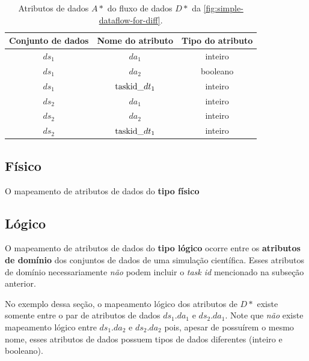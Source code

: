 \begin{table}[htb]
    \centering
    \begin{tabular}{c|c|c}
    \textbf{Conjunto de dados} & \textbf{Nome do atributo} & \textbf{Tipo do atributo} \\ \hline
$ds_1$                        & $da_1$                        & inteiro                 \\
$ds_1$                        & $da_2$                        & booleano                \\
$ds_1$                        & $\textup{taskid\_}dt_1$      & inteiro                 \\ \hline
$ds_2$                        & $da_1$                        & inteiro                 \\
$ds_2$                        & $da_2$                        & inteiro                 \\
$ds_2$                        & $\textup{taskid\_}dt_1$      & inteiro                
    \end{tabular}
    \caption[Atributos de dados do fluxo de dados da \autoref{fig:simple-dataflow-for-diff}]{Atributos de dados \(A\ast\) do fluxo de dados \(D\ast\) da \autoref{fig:simple-dataflow-for-diff}.}
    \label{tab:simple-attributes-for-diff}
\end{table}

\subsection{Físico}

O mapeamento de atributos de dados do \textbf{tipo físico}

\subsection{Lógico}

O mapeamento de atributos de dados do \textbf{tipo lógico} ocorre entre os \textbf{atributos de domínio} dos conjuntos de dados de uma simulação científica. Esses atributos de domínio necessariamente \emph{não} podem incluir o \emph{task id} mencionado na subseção anterior.

No exemplo dessa seção, o mapeamento lógico dos atributos de \(D\ast\) existe somente entre o par de atributos de dados \(ds_1.da_1\) e \(ds_2.da_1\). Note que \emph{não} existe mapeamento lógico entre \(ds_1.da_2\) e \(ds_2.da_2\) pois, apesar de possuírem o mesmo nome, esses atributos de dados possuem tipos de dados diferentes (inteiro e booleano).

